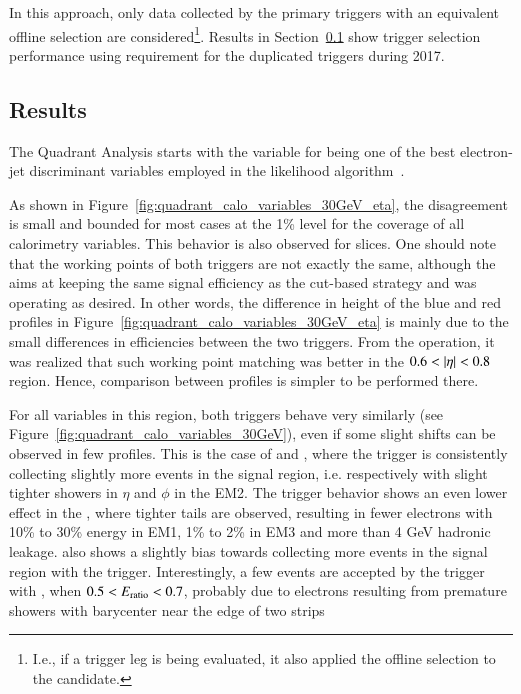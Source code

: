 In this approach, only data collected by the primary triggers with an equivalent offline selection are considered\footnote{I.e., if a \tight{} trigger leg is being evaluated, it also applied the \tight{} offline selection to the candidate.}.
Results in Section~\ref{top:quadrant_results} show
trigger selection performance using \tight{} requirement for the duplicated triggers during 2017.

\subsection{Results}\label{top:quadrant_results}



The Quadrant Analysis starts with the variable \reta{} for being one of the best electron-jet discriminant variables employed in the likelihood
algorithm~\cite{aaboud2019electron}. 



As shown in Figure~\ref{fig:quadrant_calo_variables_30GeV_eta}, the disagreement is small and bounded for most cases at the 1\% level for the coverage of all calorimetry variables. 
This behavior is also observed for \et{} slices. 
One should note that the working points of both triggers are not exactly the same, although the \rnn{} aims at keeping the same signal efficiency as the cut-based strategy and was operating as desired.  
In other words, 
the difference in height of the blue and red profiles in Figure~\ref{fig:quadrant_calo_variables_30GeV_eta} is mainly due to the small differences in efficiencies between the two triggers.
From the operation, it was realized that such working point matching was better in the $0.6<\abseta{}<0.8$ region. Hence, comparison between profiles is simpler to be performed there.

For all variables in this region, both triggers behave very similarly (see Figure~\ref{fig:quadrant_calo_variables_30GeV}), even if some slight shifts can be observed in few profiles. This is the case of \reta{} and \rphi{}, where the \rnn{} trigger is consistently collecting slightly more events in the signal region, i.e. respectively with slight tighter showers in $\eta{}$ and $\phi{}$ in the EM2. The \rnn{} trigger behavior shows an even lower effect in the \rhad{}, where tighter tails are observed, resulting in fewer electrons with 10\% to 30\% energy in EM1, 1\% to 2\% in EM3 and more than 4 GeV hadronic leakage. \eratio{} also shows a slightly bias towards collecting more events in the signal region with the \rnn{} trigger. Interestingly, a few events are accepted by the trigger with \rnn{}, when $0.5<E_\text{ratio}{}<0.7$, probably due to electrons resulting from premature showers with barycenter near the edge of two strips

